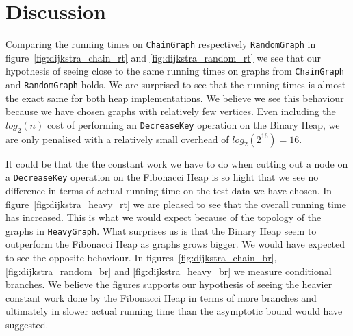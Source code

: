 \documentclass[a4paper,oneside,article,11pt]{memoir}
\begin{document}
\section{Discussion}
Comparing the running times on \texttt{ChainGraph} respectively \texttt{RandomGraph} in figure~\ref{fig:dijkstra_chain_rt} and \ref{fig:dijkstra_random_rt} we see that our hypothesis of seeing close to the same running times on graphs from \texttt{ChainGraph} and \texttt{RandomGraph} holds. We are surprised to see that the running times is almost the exact same for both heap implementations. We believe we see this behaviour because we have chosen graphs with relatively few vertices. Even including the $log_2(n)$ cost of performing an \texttt{DecreaseKey} operation on the Binary Heap, we are only penalised with a relatively small overhead of $log_2(2^{16}) = 16$.


It could be that the the constant work we have to do when cutting out a node on a \texttt{DecreaseKey} operation on the Fibonacci Heap is so hight that we see no difference in terms of actual running time on the test data we have chosen. In figure~\ref{fig:dijkstra_heavy_rt} we are pleased to see that the overall running time has increased. This is what we would expect because of the topology of the graphs in \texttt{HeavyGraph}. What surprises us is that the Binary Heap seem to outperform the Fibonacci Heap as graphs grows bigger. We would have expected to see the opposite behaviour. In figures~\ref{fig:dijkstra_chain_br}, \ref{fig:dijkstra_random_br} and \ref{fig:dijkstra_heavy_br} we measure conditional branches. We believe the figures supports our hypothesis of seeing the heavier constant work done by the Fibonacci Heap in terms of more branches and ultimately in slower actual running time than the asymptotic bound would have suggested.


\end{document}
